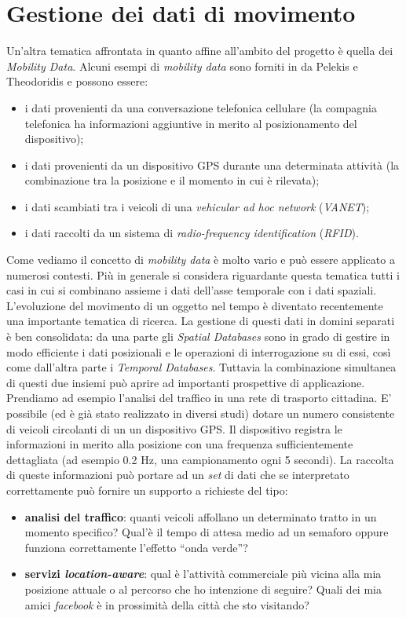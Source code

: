 \section{Gestione dei dati di movimento}
Un'altra tematica affrontata in quanto affine all'ambito del progetto è quella dei \emph{Mobility Data}. Alcuni esempi di \emph{mobility data} sono forniti in \cite{mdme} da Pelekis e Theodoridis e possono essere:
\begin{itemize}
  \item i dati provenienti da una conversazione telefonica cellulare (la compagnia telefonica ha informazioni aggiuntive in merito al posizionamento del dispositivo);
  \item i dati provenienti da un dispositivo GPS durante una determinata attività (la combinazione tra la posizione e il momento in cui è rilevata);
  \item i dati scambiati tra i veicoli di una \emph{vehicular ad hoc network} (\emph{VANET});
  \item i dati raccolti da un sistema di \emph{radio-frequency identification} (\emph{RFID}).
\end{itemize}
Come vediamo il concetto di \emph{mobility data} è molto vario e può essere applicato a numerosi contesti. Più in generale si considera riguardante questa tematica tutti i casi in cui si combinano assieme i dati dell'asse temporale con i dati spaziali. L'evoluzione del movimento di un oggetto nel tempo è diventato recentemente una importante tematica di ricerca. La gestione di questi dati in domini separati è ben consolidata: da una parte gli \emph{Spatial Databases} sono in grado di gestire in modo efficiente i dati posizionali e le operazioni di interrogazione su di essi, così come dall'altra parte i \emph{Temporal Databases}. Tuttavia la combinazione simultanea di questi due insiemi può aprire ad importanti prospettive di applicazione. Prendiamo ad esempio l'analisi del traffico in una rete di trasporto cittadina. E' possibile (ed è già stato realizzato in diversi studi) dotare un numero consistente di veicoli circolanti di un un dispositivo GPS. Il dispositivo registra le informazioni in merito alla posizione con una frequenza sufficientemente dettagliata (ad esempio 0.2 Hz, una campionamento ogni 5 secondi). La raccolta di queste informazioni può portare ad un \emph{set} di dati che se interpretato correttamente può fornire un supporto a richieste del tipo:
\begin{itemize}
  \item \textbf{analisi del traffico}: quanti veicoli affollano un determinato tratto in un momento specifico? Qual'è il tempo di attesa medio ad un semaforo oppure funziona correttamente l'effetto ``onda verde''?
  \item \textbf{servizi \emph{location-aware}}: qual è l'attività commerciale più vicina alla mia posizione attuale o al percorso che ho intenzione di seguire? Quali dei mia amici \emph{facebook} è in prossimità della città che sto visitando?
\end{itemize}

